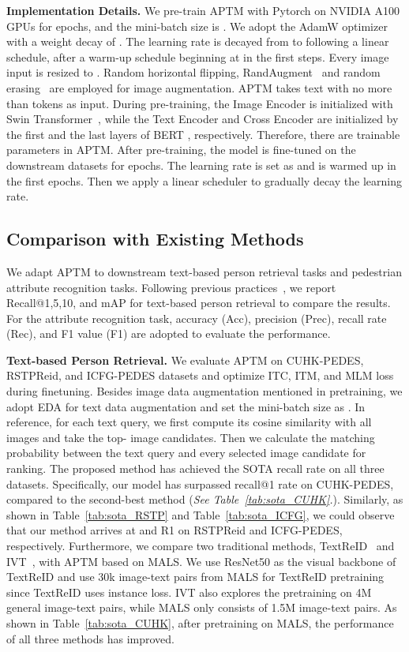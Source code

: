 \documentclass[sigconf]{acmart}
\begin{document}
\noindent\textbf{Implementation Details.}
We pre-train APTM with Pytorch on  NVIDIA A100 GPUs for  epochs, and the mini-batch size is . 
We adopt the AdamW \cite{loshchilov2018decoupled} optimizer with a weight decay of . 
The learning rate is decayed from  to  following a linear schedule, after a warm-up schedule beginning at  in the first  steps. 
Every image input is resized to . 
Random horizontal flipping, RandAugment~\cite{cubuk2020randaugment} and random erasing~\cite{zhong2020random} are employed for image augmentation.
APTM takes text with no more than  tokens as input.
During pre-training, the Image Encoder is initialized with Swin Transformer~\cite{liu2021Swin}, while the Text Encoder and Cross Encoder are initialized by the first and the last  layers of BERT \cite{kenton2019bert}, respectively. Therefore, there are  trainable parameters in APTM.
After pre-training, the model is fine-tuned on the downstream datasets for  epochs. 
The learning rate is set as  and is warmed up in the first  epochs.
Then we apply a linear scheduler to gradually decay the learning rate.


\subsection{Comparison with Existing Methods}
We adapt APTM to downstream text-based person retrieval tasks and pedestrian attribute recognition tasks. Following previous practices~\cite{shu2023see,yan2022clip}, we report Recall@1,5,10, and mAP for text-based person retrieval to compare the results. For the attribute recognition task, accuracy (Acc), precision (Prec), recall rate (Rec), and F1 value (F1) are adopted to evaluate the performance.


\noindent\textbf{Text-based Person Retrieval.}
We evaluate APTM on CUHK-PEDES, RSTPReid, and ICFG-PEDES datasets and optimize ITC, ITM, and MLM loss during finetuning. 
Besides image data augmentation mentioned in pretraining, we adopt EDA\cite{wei2019eda} for text data augmentation and set the mini-batch size as .
In reference, for each text query, we first compute its cosine similarity with all images and take the top- image candidates. Then we calculate the matching probability between the text query and every selected image candidate for ranking.
The proposed method has achieved the SOTA recall rate on all three datasets. Specifically, our model has surpassed  recall@1 rate on CUHK-PEDES, compared to the second-best method  (\emph{See Table~\ref{tab:sota_CUHK}.}). 
Similarly, as shown in Table~\ref{tab:sota_RSTP} and Table~\ref{tab:sota_ICFG}, we could observe that our method arrives at  and  R1 on RSTPReid and ICFG-PEDES, respectively.
Furthermore, we compare two traditional methods, TextReID~\cite{han2021text} and IVT~\cite{shu2023see}, with APTM based on MALS. We use ResNet50 as the visual backbone of TextReID and use 30k image-text pairs from MALS for TextReID pretraining since TextReID uses instance loss. IVT also explores the pretraining on 4M general image-text pairs, while MALS only consists of 1.5M image-text pairs.
As shown in Table~\ref{tab:sota_CUHK}, after pretraining on MALS, the performance of all three methods has improved.
\end{document}
